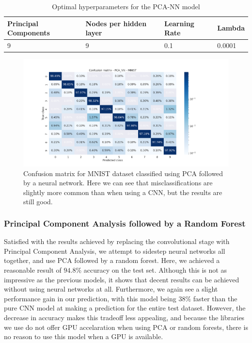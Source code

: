 \documentclass[onecolumn,10pt,cleanfoot]{asme2ej}
\begin{document}
\begin{table}[H]
\caption{Optimal hyperparameters for the PCA-NN model}
\begin{center}
\label{pcanntable}
\begin{tabular}{| l | l | l | l |}
\hline
Principal Components & Nodes per hidden layer & Learning Rate & Lambda \\
\hline
9 & 9 & 0.1 & 0.0001 \\
\hline
\end{tabular}
\end{center}
\end{table}

\begin{figure}[H]
\centerline{\includegraphics[width=8in]{figure/conf_pca_nn_MNIST.png}}
\caption{Confusion matrix for MNIST dataset classified using PCA followed by a neural network. Here we can see that misclassifications are slightly more common than when using a CNN, but the results are still good.}
\label{mnistheatmap_pcann}
\end{figure}


\subsubsection{Principal Component Analysis followed by a Random Forest}

Satisfied with the results achieved by replacing the convolutional stage with Principal Component Analysis, we attempt to sidestep neural networks all together, and use PCA followed by a random forest. Here, we achieved a reasonable result of $94.8\%$ accuracy on the test set. Although this is not as impressive as the previous models, it shows that decent results can be achieved without using neural networks at all. Furthermore, we again see a slight performance gain in our prediction, with this model being $38\%$ faster than the pure CNN model at making a prediction for the entire test dataset. However, the decrease in accuracy makes this tradeoff less appealing, and because the libraries we use do not offer GPU accelaration when using PCA or random forests, there is no reason to use this model when a GPU is available.
\end{document}
